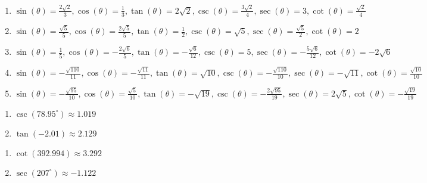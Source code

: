 \documentclass{ximera}
\begin{document}
\begin{enumerate}
\item $\sin(\theta) = \frac{2\sqrt{2}}{3}, \cos(\theta) = \frac{1}{3}, \tan(\theta) = 2\sqrt{2}, \csc(\theta) = \frac{3\sqrt{2}}{4}, \sec(\theta) = 3, \cot(\theta) = \frac{\sqrt{2}}{4}$

\item $\sin(\theta) = \frac{\sqrt{5}}{5}, \cos(\theta) = \frac{2\sqrt{5}}{5}, \tan(\theta) = \frac{1}{2}, \csc(\theta) = \sqrt{5}, \sec(\theta) = \frac{\sqrt{5}}{2}, \cot(\theta) = 2$

\item $\sin(\theta) = \frac{1}{5}, \cos(\theta) = -\frac{2\sqrt{6}}{5}, \tan(\theta) = -\frac{\sqrt{6}}{12}, \csc(\theta) = 5, \sec(\theta) = -\frac{5\sqrt{6}}{12}, \cot(\theta) = -2\sqrt{6}$

\item $\sin(\theta) = -\frac{\sqrt{110}}{11}, \cos(\theta) = -\frac{\sqrt{11}}{11}, \tan(\theta) = \sqrt{10}, \csc(\theta) = -\frac{\sqrt{110}}{10}, \sec(\theta) = -\sqrt{11}, \cot(\theta) = \frac{\sqrt{10}}{10}$

\item $\sin(\theta) = -\frac{\sqrt{95}}{10}, \cos(\theta) = \frac{\sqrt{5}}{10}, \tan(\theta) = -\sqrt{19}, \csc(\theta) = -\frac{2\sqrt{95}}{19}, \sec(\theta) = 2\sqrt{5}, \cot(\theta) = -\frac{\sqrt{19}}{19}$

\setcounter{HW}{\value{enumi}}

\end{enumerate}

\begin{multicols}{2}

\begin{enumerate}

\setcounter{enumi}{\value{HW}}

\item $\csc(78.95^{\circ}) \approx 1.019$
\item $\tan(-2.01) \approx 2.129$

\setcounter{HW}{\value{enumi}}

\end{enumerate}

\end{multicols}

\begin{multicols}{2}

\begin{enumerate}

\setcounter{enumi}{\value{HW}}

\item $\cot(392.994) \approx 3.292$
\item $\sec(207^{\circ}) \approx -1.122$

\setcounter{HW}{\value{enumi}}

\end{enumerate}

\end{multicols}
\end{document}
